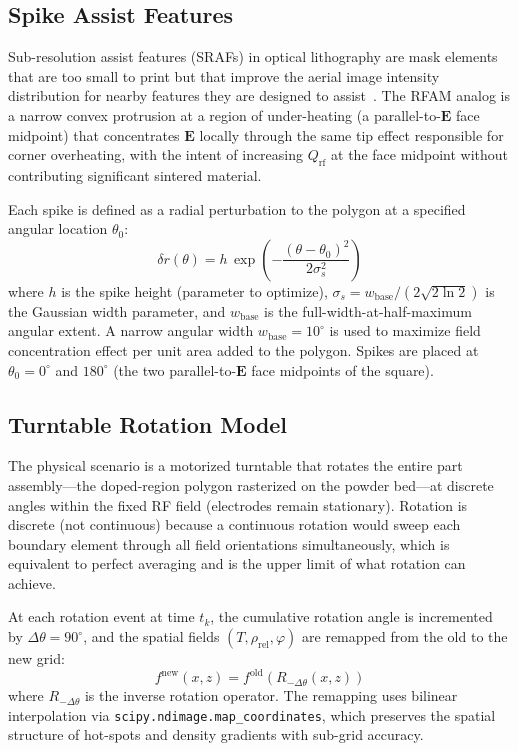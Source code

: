 \documentclass[5p,times]{elsarticle}
\newcommand{\Qrf}{Q_{\mathrm{rf}}}
\newcommand{\rhorel}{\rho_{\mathrm{rel}}}
\newcommand{\phimelt}{\varphi}
\newcommand{\vect}[1]{\boldsymbol{#1}}
\begin{document}
\subsection{Spike Assist Features}
\label{sec:spike_method}

Sub-resolution assist features (SRAFs) in optical lithography are mask
elements that are too small to print but that improve the aerial image
intensity distribution for nearby features they are designed to
assist~\cite{pang2021inverse}.  The RFAM analog is a narrow convex
protrusion at a region of under-heating (a parallel-to-$\vect{E}$ face
midpoint) that concentrates $\vect{E}$ locally through the same tip
effect responsible for corner overheating, with the intent of
increasing $\Qrf$ at the face midpoint without contributing significant
sintered material.

Each spike is defined as a radial perturbation to the polygon at a
specified angular location $\theta_0$:
\begin{equation}
  \delta r(\theta) = h\,\exp\!\!\left(-\frac{(\theta-\theta_0)^2}{2\sigma_s^2}\right)
  \label{eq:spike_profile}
\end{equation}
where $h$ is the spike height (parameter to optimize),
$\sigma_s = w_{\mathrm{base}} / (2\sqrt{2\ln 2})$ is the Gaussian
width parameter, and $w_{\mathrm{base}}$ is the full-width-at-half-maximum
angular extent.  A narrow angular width $w_{\mathrm{base}} = 10^\circ$
is used to maximize field concentration effect per unit area added to
the polygon.  Spikes are placed at $\theta_0 = 0^\circ$ and
$180^\circ$ (the two parallel-to-$\vect{E}$ face midpoints of the
square).

\subsection{Turntable Rotation Model}
\label{sec:turntable_method}

The physical scenario is a motorized turntable that rotates the entire
part assembly---the doped-region polygon rasterized on the powder
bed---at discrete angles within the fixed RF field (electrodes remain
stationary).  Rotation is discrete (not continuous) because a
continuous rotation would sweep each boundary element through all
field orientations simultaneously, which is equivalent to perfect
averaging and is the upper limit of what rotation can achieve.

At each rotation event at time $t_k$, the cumulative rotation angle
is incremented by $\Delta\theta = 90^\circ$, and the spatial fields
$(T, \rhorel, \phimelt)$ are remapped from the old to the new grid:
\begin{equation}
  f^{\mathrm{new}}(x, z) = f^{\mathrm{old}}(R_{-\Delta\theta}(x,z))
  \label{eq:rotation_remap}
\end{equation}
where $R_{-\Delta\theta}$ is the inverse rotation operator.  The
remapping uses bilinear interpolation via
\texttt{scipy.ndimage.map\_coordinates}, which preserves the spatial
structure of hot-spots and density gradients with sub-grid accuracy.
\end{document}
